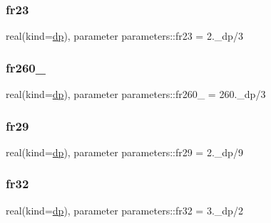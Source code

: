 \mbox{\label{group__FRACTIONS_gaf550152b4a78556eab5e45a3505a690e}} 
\subsubsection{\texorpdfstring{fr23}{fr23}}
{\footnotesize\ttfamily real(kind=\mbox{\hyperlink{namespaceparameters_a52f8c6351fd79345d8811e065bcbbb37}{dp}}), parameter parameters\+::fr23 = 2.\+\_\+dp/3}

\mbox{\label{group__FRACTIONS_ga5a9e77cd58019aeeb71cd5be86faf68f}} 
\subsubsection{\texorpdfstring{fr260\+\_}{fr260\_3}}
{\footnotesize\ttfamily real(kind=\mbox{\hyperlink{namespaceparameters_a52f8c6351fd79345d8811e065bcbbb37}{dp}}), parameter parameters\+::fr260\+\_ = 260.\+\_\+dp/3}

\mbox{\label{group__FRACTIONS_gaae4b443a271ca66ffd82ed02a3062073}} 
\subsubsection{\texorpdfstring{fr29}{fr29}}
{\footnotesize\ttfamily real(kind=\mbox{\hyperlink{namespaceparameters_a52f8c6351fd79345d8811e065bcbbb37}{dp}}), parameter parameters\+::fr29 = 2.\+\_\+dp/9}

\mbox{\label{group__FRACTIONS_gadb06185f00fedb4688eb75250f7365de}} 
\subsubsection{\texorpdfstring{fr32}{fr32}}
{\footnotesize\ttfamily real(kind=\mbox{\hyperlink{namespaceparameters_a52f8c6351fd79345d8811e065bcbbb37}{dp}}), parameter parameters\+::fr32 = 3.\+\_\+dp/2}

